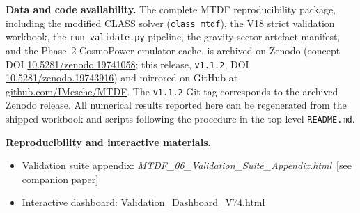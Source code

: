 \documentclass[11pt,a4paper]{article}
\begin{document}
\begin{mdframed}[linecolor=accent,linewidth=0.5pt,backgroundcolor=callout-bg,leftline=true,rightline=true,topline=true,bottomline=true,innerleftmargin=8pt,innerrightmargin=8pt,innertopmargin=6pt,innerbottommargin=6pt]
\textbf{Data and code availability.}
The complete MTDF reproducibility package, including the modified CLASS solver
(\texttt{class\_\allowbreak{}mtdf}), the V18 strict validation workbook, the
\texttt{run\_\allowbreak{}validate.py} pipeline, the gravity-sector artefact
manifest, and the Phase~2 CosmoPower emulator cache, is archived on Zenodo
(concept DOI \href{https://doi.org/10.5281/zenodo.19741058}{10.5281/\allowbreak{}zenodo.\allowbreak{}19741058};
this release, \texttt{v1.1.2}, DOI
\href{https://doi.org/10.5281/zenodo.19743916}{10.5281/\allowbreak{}zenodo.\allowbreak{}19743916})
and mirrored on GitHub at
\href{https://github.com/IMesche/MTDF}{github.com/\allowbreak{}IMesche/\allowbreak{}MTDF}.
The \texttt{v1.1.2} Git tag corresponds to the archived Zenodo release. All
numerical results reported here can be regenerated from the shipped workbook
and scripts following the procedure in the top-level \texttt{README.md}.

\textbf{Reproducibility and interactive materials.}\begin{itemize}
  \item Validation suite appendix: \textit{MTDF\_\allowbreak{}06\_\allowbreak{}Validation\_\allowbreak{}Suite\_\allowbreak{}Appendix.html}~[see companion paper]
  \item Interactive dashboard: Validation\_\allowbreak{}Dashboard\_\allowbreak{}V74.html
\end{itemize}
\end{mdframed}
\end{document}
